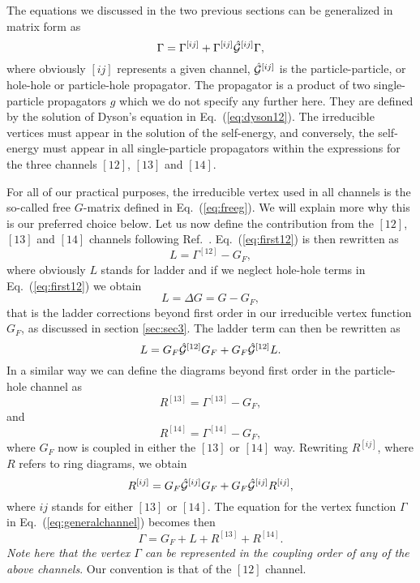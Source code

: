 The equations we discussed in the two previous sections can 
be generalized
in matrix form as
\begin{equation} 
      \Gamma= \Gamma^{[ij]}+\Gamma^{[ij]}\hat{{\cal G}}^{[ij]}\Gamma,
      \label{eq:generalchannel}
\end{equation}
where obviously $[ij]$ represents a given channel,
$\hat{{\cal G}}^{[ij]}$ is the particle-particle, or hole-hole or particle-hole
propagator. 
The propagator is a product of two single-particle propagators $g$
which we do not specify any further here. They are
defined by the solution of Dyson's equation in Eq.\ (\ref{eq:dyson12}).
The irreducible vertices must appear in the solution of
the self-energy, and conversely, the self-energy must appear in all
single-particle propagators within the expressions for the three
channels $[12]$, $[13]$ and $[14]$. 

For all of our practical purposes, the irreducible vertex used in all
channels is the so-called free $G$-matrix defined in Eq.\
(\ref{eq:freeg}). We will explain more why this is our preferred choice
below.
Let us now define the contribution from the $[12]$, $[13]$ and
$[14]$ channels following Ref.\ \cite{jls82}. 
Eq.\ (\ref{eq:first12}) is then rewritten as
\begin{equation}
    L=\Gamma^{[12]}-G_F,
\end{equation}
where obviously $L$ stands for ladder and if we neglect hole-hole
terms in Eq.\ (\ref{eq:first12}) we obtain 
\begin{equation}
    L=\Delta G =G-G_F,
\end{equation}
that is the ladder corrections beyond first order in our 
irreducible vertex function $G_F$, as discussed in section \ref{sec:sec3}.
The ladder term can then be rewritten as 
\begin{equation}
    L=G_F\hat{{\cal G}}^{[12]}G_F+G_F\hat{{\cal G}}^{[12]}L.
    \label{eq:ladder}
\end{equation}
In a similar way we can define the diagrams beyond
first order in the particle-hole channel as
\begin{equation}
    R^{[13]}=\Gamma^{[13]}-G_F,
\end{equation}
and 
\begin{equation}
    R^{[14]}=\Gamma^{[14]}-G_F,
\end{equation}
where $G_F$ now is coupled in either the $[13]$ or $[14]$ way.
Rewriting $R^{[ij]}$, where $R$ refers to ring diagrams,
we obtain
\begin{equation}
    R^{[ij]}=G_F\hat{{\cal G}}^{[ij]}G_F+G_F\hat{{\cal G}}^{[ij]}R^{[ij]},
    \label{eq:ring}
\end{equation}
where $ij$ stands for either $[13]$ or $[14]$.
The equation for the vertex function $\Gamma$ in Eq.\
(\ref{eq:generalchannel}) becomes then
\begin{equation}
    \Gamma=G_F+L+R^{[13]}+R^{[14]}.
     \label{eq:gammap}
\end{equation}
{\em Note here that the vertex $\Gamma$ can be represented in the coupling
order of any of the above channels}. Our convention is that of the 
$[12]$ channel.


